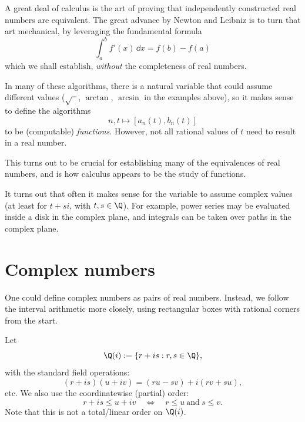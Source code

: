 \begin{remark}\label{rem:calculus-as-equivalence}
A great deal of calculus is the art of proving that independently constructed
real numbers are equivalent. The great advance by Newton and Leibniz is
to turn that art mechanical, by leveraging the fundamental formula
\[
  \int_a^b f'(x)\,\dd x = f(b)-f(a)
\]
which we shall establish, \emph{without} the completeness of real numbers.
\end{remark}

\begin{remark}\label{rem:parameterized-constructions}
In many of these algorithms, there is a natural variable that could assume
different values (\(\sqrt{\phantom{x}}\), \(\arctan\), \(\arcsin\) in the
examples above), so it makes sense to define the algorithms
\[
  n,t\longmapsto [a_n(t),b_n(t)]
\]
to be (computable) \emph{functions}. However, not all rational values of \(t\)
need to result in a real number.

This turns out to be crucial for establishing many of the equivalences of real
numbers, and is how calculus appears to be the study of functions.
\end{remark}

\begin{remark}\label{rem:complex-parameters}
It turns out that often it makes sense for the variable to assume complex values
(at least for \(t+si\), with \(t,s\in\Q\)).  For example, power series may be evaluated
inside a disk in the complex plane, and integrals can be taken over paths in the complex plane.
\end{remark}

\section{Complex numbers \humanchecked}

One could define complex numbers as pairs of real numbers.  Instead, we follow
the interval arithmetic more closely, using rectangular boxes with rational corners
from the start.

\begin{definition}[Field \(\Q(i)\)]\label{def:qcomplex}
Let
\[
  \Q(i):=\{r+is:r,s\in\Q\},
\]
with the standard field operations:
\[
  (r+is)(u+iv)=(ru-sv)+i(rv+su),
\]
etc. We also use the coordinatewise (partial) order:
\[
  r+is \le u+iv
  \quad\Longleftrightarrow\quad
  r\le u\ \text{and}\ s\le v.
\]
Note that this is not a total/linear order on \(\Q(i)\).
\end{definition}

